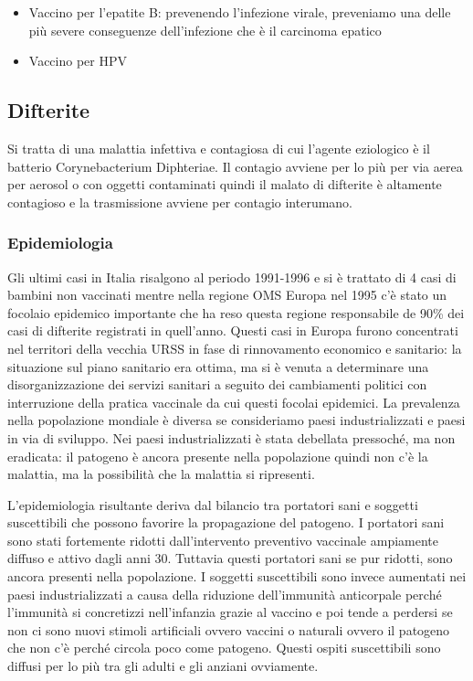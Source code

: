 \begin{itemize}
\item
  Vaccino per l'epatite B: prevenendo l'infezione virale, preveniamo una
  delle più severe conseguenze dell'infezione che è il carcinoma epatico
\item
  Vaccino per HPV
\end{itemize}

\subsection{Difterite}

  Si tratta di una malattia infettiva e contagiosa di cui l'agente
  eziologico è il batterio Corynebacterium Diphteriae. Il contagio
  avviene per lo più per via aerea per aerosol o con oggetti contaminati
  quindi il malato di difterite è altamente contagioso e la trasmissione
  avviene per contagio interumano.

\subsubsection{Epidemiologia}

  Gli ultimi casi in Italia risalgono al periodo 1991-1996 e si è
  trattato di 4 casi di bambini non vaccinati mentre nella regione OMS
  Europa nel 1995 c'è stato un focolaio epidemico importante che ha reso
  questa regione responsabile de 90\% dei casi di difterite registrati
  in quell'anno. Questi casi in Europa furono concentrati nel territori
  della vecchia URSS in fase di rinnovamento economico e sanitario: la
  situazione sul piano sanitario era ottima, ma si è venuta a
  determinare una disorganizzazione dei servizi sanitari a seguito dei
  cambiamenti politici con interruzione della pratica vaccinale da cui
  questi focolai epidemici. La prevalenza nella popolazione mondiale è
  diversa se consideriamo paesi industrializzati e paesi in via di
  sviluppo. Nei paesi industrializzati è stata debellata pressoché, ma
  non eradicata: il patogeno è ancora presente nella popolazione quindi
  non c'è la malattia, ma la possibilità che la malattia si ripresenti.

  L'epidemiologia risultante deriva dal bilancio tra portatori sani e
  soggetti suscettibili che possono favorire la propagazione del
  patogeno. I portatori sani sono stati fortemente ridotti
  dall'intervento preventivo vaccinale ampiamente diffuso e attivo dagli
  anni 30. Tuttavia questi portatori sani se pur ridotti, sono ancora
  presenti nella popolazione. I soggetti suscettibili sono invece
  aumentati nei paesi industrializzati a causa della riduzione
  dell'immunità anticorpale perché l'immunità si concretizzi
  nell'infanzia grazie al vaccino e poi tende a perdersi se non ci sono
  nuovi stimoli artificiali ovvero vaccini o naturali ovvero il patogeno
  che non c'è perché circola poco come patogeno. Questi ospiti
  suscettibili sono diffusi per lo più tra gli adulti e gli anziani
  ovviamente.

